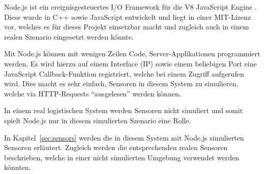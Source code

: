 Node.js ist ein ereignisgesteuertes I/O Framework für die V8 JavaScript
	Engine \cite{Wikipedia10a}. Diese wurde in C++ sowie JavaScript entwickelt
	und liegt in einer MIT-Lizenz vor, welches es für dieses Projekt einsetzbar
	macht und zugleich auch in einem realen Szenario eingesetzt werden könnte.

Mit Node.js können mit wenigen Zeilen Code, Server-Applikationen programmiert
	werden. Es wird hierzu auf einem Interface (IP) sowie einem beliebigen Port
	eine JavaScript Callback-Funktion registriert, welche bei einem Zugriff
	aufgerufen wird. Dies macht es sehr einfach, Sensoren in diesem System zu
	simulieren, welche via HTTP-Requests ``ausgelesen'' werden können.
	
In einem real logistischen System werden Sensoren nicht simuliert und somit
	spielt Node.js nur in diesem simulierten Szenario eine Rolle.
	
In Kapitel~\ref{sec:sensors} werden die in diesem System mit Node.js simulierten
	Sensoren erläutert. Zugleich werden die entsprechenden realen Sensoren
	beschrieben, welche in einer nicht simulierten Umgebung verwendet werden
	könnten.